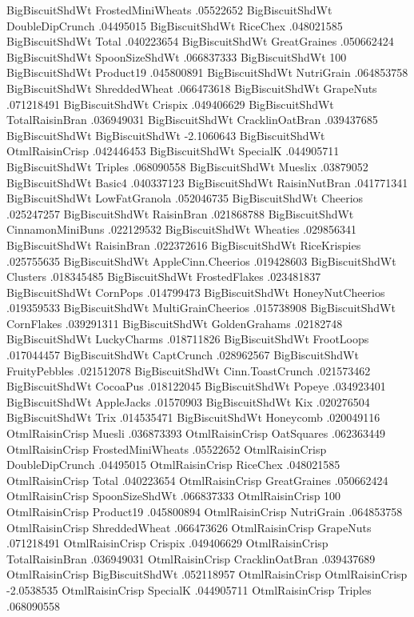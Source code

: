 BigBiscuitShdWt	FrostedMiniWheats	.05522652
BigBiscuitShdWt	DoubleDipCrunch	.04495015
BigBiscuitShdWt	RiceChex	.048021585
BigBiscuitShdWt	Total	.040223654
BigBiscuitShdWt	GreatGraines	.050662424
BigBiscuitShdWt	SpoonSizeShdWt	.066837333
BigBiscuitShdWt	100%
BigBiscuitShdWt	Product19	.045800891
BigBiscuitShdWt	NutriGrain	.064853758
BigBiscuitShdWt	ShreddedWheat	.066473618
BigBiscuitShdWt	GrapeNuts	.071218491
BigBiscuitShdWt	Crispix	.049406629
BigBiscuitShdWt	TotalRaisinBran	.036949031
BigBiscuitShdWt	CracklinOatBran	.039437685
BigBiscuitShdWt	BigBiscuitShdWt	-2.1060643
BigBiscuitShdWt	OtmlRaisinCrisp	.042446453
BigBiscuitShdWt	SpecialK	.044905711
BigBiscuitShdWt	Triples	.068090558
BigBiscuitShdWt	Mueslix	.03879052
BigBiscuitShdWt	Basic4	.040337123
BigBiscuitShdWt	RaisinNutBran	.041771341
BigBiscuitShdWt	LowFatGranola	.052046735
BigBiscuitShdWt	Cheerios	.025247257
BigBiscuitShdWt	RaisinBran	.021868788
BigBiscuitShdWt	CinnamonMiniBuns	.022129532
BigBiscuitShdWt	Wheaties	.029856341
BigBiscuitShdWt	RaisinBran	.022372616
BigBiscuitShdWt	RiceKrispies	.025755635
BigBiscuitShdWt	AppleCinn.Cheerios	.019428603
BigBiscuitShdWt	Clusters	.018345485
BigBiscuitShdWt	FrostedFlakes	.023481837
BigBiscuitShdWt	CornPops	.014799473
BigBiscuitShdWt	HoneyNutCheerios	.019359533
BigBiscuitShdWt	MultiGrainCheerios	.015738908
BigBiscuitShdWt	CornFlakes	.039291311
BigBiscuitShdWt	GoldenGrahams	.02182748
BigBiscuitShdWt	LuckyCharms	.018711826
BigBiscuitShdWt	FrootLoops	.017044457
BigBiscuitShdWt	CaptCrunch	.028962567
BigBiscuitShdWt	FruityPebbles	.021512078
BigBiscuitShdWt	Cinn.ToastCrunch	.021573462
BigBiscuitShdWt	CocoaPus	.018122045
BigBiscuitShdWt	Popeye	.034923401
BigBiscuitShdWt	AppleJacks	.01570903
BigBiscuitShdWt	Kix	.020276504
BigBiscuitShdWt	Trix	.014535471
BigBiscuitShdWt	Honeycomb	.020049116
OtmlRaisinCrisp	Muesli	.036873393
OtmlRaisinCrisp	OatSquares	.062363449
OtmlRaisinCrisp	FrostedMiniWheats	.05522652
OtmlRaisinCrisp	DoubleDipCrunch	.04495015
OtmlRaisinCrisp	RiceChex	.048021585
OtmlRaisinCrisp	Total	.040223654
OtmlRaisinCrisp	GreatGraines	.050662424
OtmlRaisinCrisp	SpoonSizeShdWt	.066837333
OtmlRaisinCrisp	100%
OtmlRaisinCrisp	Product19	.045800894
OtmlRaisinCrisp	NutriGrain	.064853758
OtmlRaisinCrisp	ShreddedWheat	.066473626
OtmlRaisinCrisp	GrapeNuts	.071218491
OtmlRaisinCrisp	Crispix	.049406629
OtmlRaisinCrisp	TotalRaisinBran	.036949031
OtmlRaisinCrisp	CracklinOatBran	.039437689
OtmlRaisinCrisp	BigBiscuitShdWt	.052118957
OtmlRaisinCrisp	OtmlRaisinCrisp	-2.0538535
OtmlRaisinCrisp	SpecialK	.044905711
OtmlRaisinCrisp	Triples	.068090558
